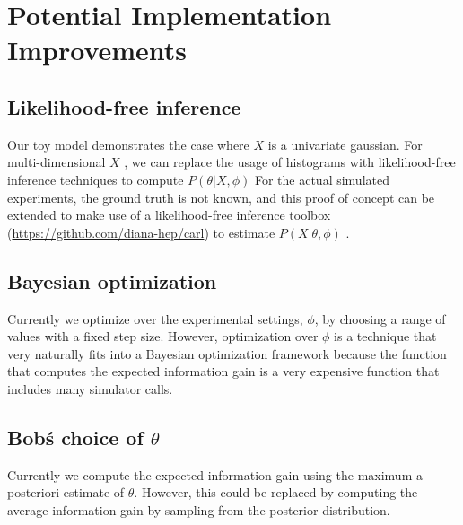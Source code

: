 \documentclass[10pt,journal,compsoc]{IEEEtran}
\begin{document}

\section{Potential Implementation Improvements}
\subsection{Likelihood-free inference}
Our toy model demonstrates the case where $X$ is a univariate gaussian. For multi-dimensional $X$ , we can replace the usage of histograms with likelihood-free inference techniques to compute $P(\theta | X, \phi)$ For the actual simulated experiments, the ground truth is not known, and this proof of concept can be extended to make use of a likelihood-free inference toolbox (\url{https://github.com/diana-hep/carl}) to estimate $P(X | \theta, \phi)$ .
\subsection{Bayesian optimization}
Currently we optimize over the experimental settings, $\phi$, by choosing a range of values with a fixed step size. However, optimization over $\phi$ is a technique that very naturally fits into a Bayesian optimization framework because the function that computes the expected information gain is a very expensive function that includes many simulator calls. 
\subsection{Bob\' s choice of $\theta$} 
Currently we compute the expected information gain using the maximum a posteriori estimate of $\theta$. However, this could be replaced by computing the average information gain by sampling from the posterior distribution.

 
\end{document}
